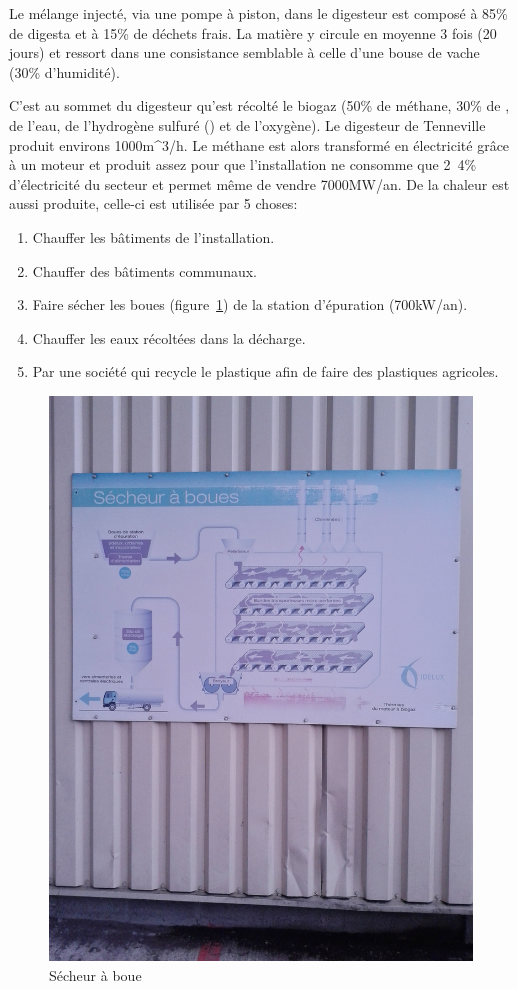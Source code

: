 Le mélange injecté, via une pompe à piston, dans le digesteur est composé à \unit{85}{\%} de digesta et à \unit{15}{\%} de déchets frais. La matière y circule en moyenne 3 fois (20 jours) et ressort dans une consistance semblable à celle d'une bouse de vache (\unit{30}{\%} d'humidité).

C'est au sommet du digesteur qu'est récolté le biogaz (\unit{50}{\%} de méthane, \unit{30}{\%} de , de l'eau, de l'hydrogène sulfuré () et de l'oxygène). Le digesteur de Tenneville produit environs \unit{1000}{m^3/h}.
Le méthane est alors transformé en électricité grâce à un moteur et produit assez pour que l'installation ne consomme que \unit{2.4}{\%} d'électricité du secteur et permet même de vendre \unit{7000}{MW/an}. De la chaleur est aussi produite, celle-ci est utilisée par 5 choses:
\begin{enumerate}
\item Chauffer les bâtiments de l'installation.
\item Chauffer des bâtiments communaux.
\item Faire sécher les boues (figure~\ref{fig:Secheur}) de la station d'épuration (\unit{700}{kW/an}).
\item Chauffer les eaux récoltées dans la décharge.
\item Par une société qui recycle le plastique afin de faire des plastiques agricoles.
\end{enumerate}
\begin{figure}
  \centering
  \includegraphics[scale=0.07]{task7/tenneville/IMG_20141105_113638.jpg}
  \caption{Sécheur à boue}
  \label{fig:Secheur}
\end{figure}
